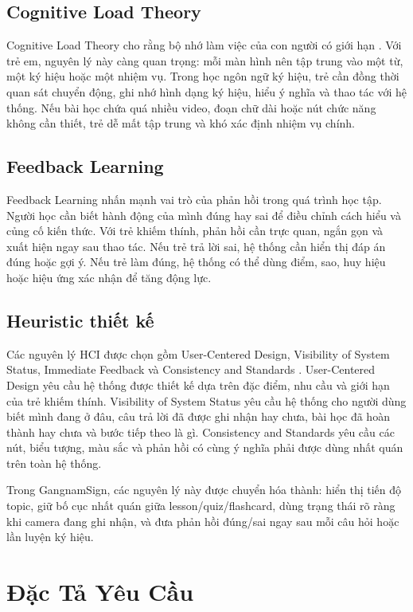 \documentclass[conference]{IEEEtran}
\begin{document}
\subsection{Cognitive Load Theory}
Cognitive Load Theory cho rằng bộ nhớ làm việc của con người có giới hạn \cite{sweller}. Với trẻ em, nguyên lý này càng quan trọng: mỗi màn hình nên tập trung vào một từ, một ký hiệu hoặc một nhiệm vụ. Trong học ngôn ngữ ký hiệu, trẻ cần đồng thời quan sát chuyển động, ghi nhớ hình dạng ký hiệu, hiểu ý nghĩa và thao tác với hệ thống. Nếu bài học chứa quá nhiều video, đoạn chữ dài hoặc nút chức năng không cần thiết, trẻ dễ mất tập trung và khó xác định nhiệm vụ chính.

\subsection{Feedback Learning}
Feedback Learning nhấn mạnh vai trò của phản hồi trong quá trình học tập. Người học cần biết hành động của mình đúng hay sai để điều chỉnh cách hiểu và củng cố kiến thức. Với trẻ khiếm thính, phản hồi cần trực quan, ngắn gọn và xuất hiện ngay sau thao tác. Nếu trẻ trả lời sai, hệ thống cần hiển thị đáp án đúng hoặc gợi ý. Nếu trẻ làm đúng, hệ thống có thể dùng điểm, sao, huy hiệu hoặc hiệu ứng xác nhận để tăng động lực.

\subsection{Heuristic thiết kế}
Các nguyên lý HCI được chọn gồm User-Centered Design, Visibility of System Status, Immediate Feedback và Consistency and Standards \cite{nielsen}. User-Centered Design yêu cầu hệ thống được thiết kế dựa trên đặc điểm, nhu cầu và giới hạn của trẻ khiếm thính. Visibility of System Status yêu cầu hệ thống cho người dùng biết mình đang ở đâu, câu trả lời đã được ghi nhận hay chưa, bài học đã hoàn thành hay chưa và bước tiếp theo là gì. Consistency and Standards yêu cầu các nút, biểu tượng, màu sắc và phản hồi có cùng ý nghĩa phải được dùng nhất quán trên toàn hệ thống.

Trong GangnamSign, các nguyên lý này được chuyển hóa thành: hiển thị tiến độ topic, giữ bố cục nhất quán giữa lesson/quiz/flashcard, dùng trạng thái rõ ràng khi camera đang ghi nhận, và đưa phản hồi đúng/sai ngay sau mỗi câu hỏi hoặc lần luyện ký hiệu.

\section{Đặc Tả Yêu Cầu}
\end{document}
